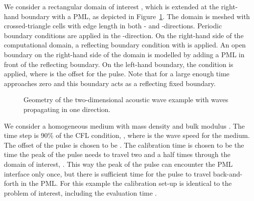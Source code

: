 \documentclass[a4paper]{article}
\begin{document}
We consider a rectangular domain of interest , which is extended at the
right-hand boundary with a PML, as depicted in
Figure~\ref{fig:acoustic}. The domain is meshed with crossed-triangle
cells with edge length  in both - and
-directions. Periodic boundary conditions are applied in the
-direction. On the right-hand side of the computational domain, a
reflecting boundary condition with  is applied. An
open boundary on the right-hand side of the domain is modelled by
adding a PML in front of the reflecting boundary.  On the left-hand
boundary, the condition  is
applied, where  is the offset for the pulse. Note that for a
large enough time  approaches zero and this boundary acts as
a reflecting fixed boundary.
\begin{figure}
  \centering
  \caption{Geometry of the two-dimensional acoustic wave example with
    waves propagating in one direction.}
  \label{fig:acoustic}
\end{figure}
We consider a homogeneous medium with mass density  and bulk modulus . The time step is 90\% of the CFL condition, , where  is
the wave speed for the medium.  The offset of the pulse is chosen to
be . The calibration time  is chosen to be
the time the peak of the pulse needs to travel two and a half times
through the domain of interest, .
This way the peak of the pulse can encounter the PML interface only
once, but there is sufficient time for the pulse to travel
back-and-forth in the PML. For this example the calibration set-up is
identical to the problem of interest, including the evaluation time
.
\end{document}
